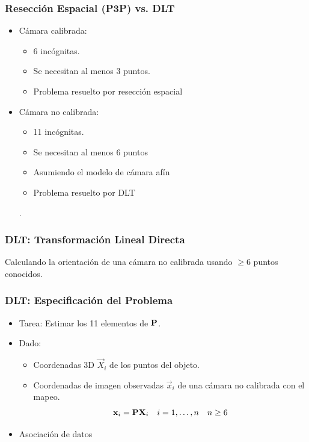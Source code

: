 \begin{frame}
  \frametitle{Resección Espacial (P3P) vs. DLT}
  \begin{itemize}
    \item Cámara calibrada: 
    \begin{itemize}
      \item 6 incógnitas.
      \item Se necesitan al menos 3 puntos.
      \item Problema resuelto por resección espacial
    \end{itemize}
    \item Cámara no calibrada: 
    \begin{itemize}
      \item 11 incógnitas.
      \item Se necesitan al menos 6 puntos 
      \item Asumiendo el modelo de cámara afín
      \item Problema resuelto por DLT
    \end{itemize}.
  \end{itemize}
\end{frame}

\begin{frame}
  \frametitle{DLT: Transformación Lineal Directa}
  Calculando la orientación de una cámara no calibrada usando $\ge 6$ puntos conocidos.
\end{frame}

\begin{frame}
  \frametitle{DLT: Especificación del Problema}
  \begin{itemize}
    \item Tarea: Estimar los 11 elementos de $\boldsymbol{\mathbf{P}}$.
    \item Dado: 
    \begin{itemize}
      \item Coordenadas 3D $\vec{X}_{i}$ de los puntos del objeto.
      \item Coordenadas de imagen observadas $\vec{x}_{i}$ de una cámara no calibrada con el mapeo.
      \begin{equation*}
        \boldsymbol{\mathbf{x}}_{i} = \boldsymbol{\mathbf{P}} \boldsymbol{\mathbf{X}}_{i} \quad i=1,\ldots,n \quad n \ge 6
      \end{equation*}
    \end{itemize}
    \item Asociación de datos
  \end{itemize}

\end{frame}

